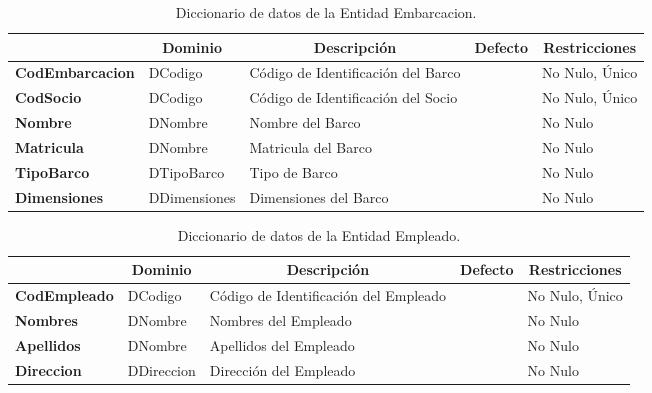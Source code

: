 \begin{table}[H]
\centering
\caption{Diccionario de datos de la Entidad Embarcacion.}
\label{tab-DiccR-3c}
\begin{tabular}{>{\bfseries}m{4.0cm}>{}m{3.0cm}>{}m{6.0cm}>{}m{5.0cm}>{}m{2.0cm}}
\toprule
\multicolumn{1}{c}{\textbf{Atributo}} & \multicolumn{1}{c}{\textbf{Dominio}} & \multicolumn{1}{c}{\textbf{Descripción}} & \multicolumn{1}{c}{\textbf{Defecto}} & \multicolumn{1}{c}{\textbf{Restricciones}} \\ \midrule
CodEmbarcacion	&	DCodigo	&	Código de Identificación del Barco	&		&	No Nulo, Único\\
CodSocio	&	DCodigo	&	Código de Identificación del Socio	&		&	No Nulo, Único\\
Nombre	&	DNombre	&	Nombre del Barco	&		&	No Nulo\\
Matricula	&	DNombre	&	Matricula del Barco	&		&	No Nulo\\
TipoBarco	&	DTipoBarco	&	Tipo de Barco	&		&	No Nulo\\
Dimensiones	&	DDimensiones	&	Dimensiones del Barco	&		&	No Nulo\\
\bottomrule
\end{tabular}
\end{table}

\begin{table}[H]
\centering
\caption{Diccionario de datos de la Entidad Empleado.}
\label{tab-DiccR-3d}
\begin{tabular}{>{\bfseries}m{4.0cm}>{}m{3.0cm}>{}m{6.0cm}>{}m{5.0cm}>{}m{2.0cm}}
\toprule
\multicolumn{1}{c}{\textbf{Atributo}} & \multicolumn{1}{c}{\textbf{Dominio}} & \multicolumn{1}{c}{\textbf{Descripción}} & \multicolumn{1}{c}{\textbf{Defecto}} & \multicolumn{1}{c}{\textbf{Restricciones}} \\ \midrule
CodEmpleado	&	DCodigo	&	Código de Identificación del Empleado	&		&	No Nulo, Único\\
Nombres	&	DNombre	&	Nombres del Empleado	&		&	No Nulo\\
Apellidos	&	DNombre	&	Apellidos del Empleado	&		&	No Nulo\\
Direccion	&	DDireccion	&	Dirección del Empleado	&		&	No Nulo\\
\bottomrule
\end{tabular}
\end{table}

